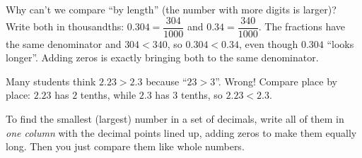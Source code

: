 \begin{proofbox}
Why can't we compare ``by length'' (the number with more digits is larger)? Write both in thousandths:
$0.304 = \dfrac{304}{1000}$ and $0.34 = \dfrac{340}{1000}$. The fractions have the same denominator and $304 < 340$, so
$0.304 < 0.34$, even though $0.304$ ``looks longer''. Adding zeros is exactly bringing both to the same denominator.
\end{proofbox}
\begin{warnbox}
Many students think $2.23 > 2.3$ because ``$23 > 3$''. Wrong! Compare place by place: $2.23$ has $2$ tenths,
while $2.3$ has $3$ tenths, so $2.23 < 2.3$.
\end{warnbox}
\begin{tipbox}
To find the smallest (largest) number in a set of decimals, write all of them in \emph{one column} with the decimal
points lined up, adding zeros to make them equally long. Then you just compare them like whole numbers.
\end{tipbox}


